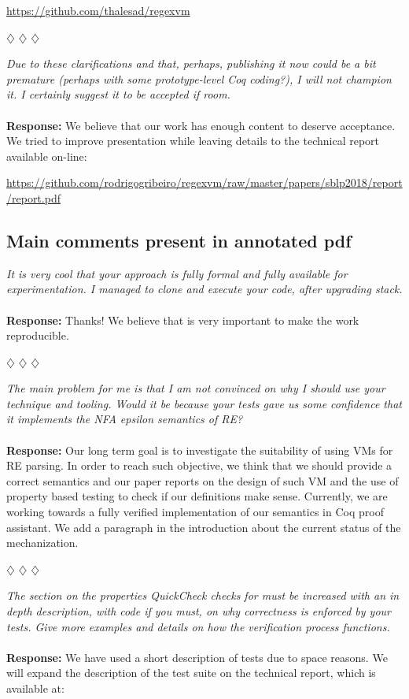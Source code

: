 \documentclass{article}
\newcommand{\separador}{\begin{center}
$\diamondsuit$ $\diamondsuit$ $\diamondsuit$
\end{center}}
\newcommand{\repo}{\begin{center}\url{https://github.com/thalesad/regexvm}\end{center}}
\newcommand{\report}{\begin{center}\url{https://github.com/rodrigogribeiro/regexvm/raw/master/papers/sblp2018/report/report.pdf}\end{center}}
\begin{document}
\repo


\separador

\noindent\textit{Due to these clarifications and that, perhaps, publishing it now could be a bit premature (perhaps with some
prototype-level Coq coding?), I will not champion it. I certainly suggest it to be accepted if room.}
\\
\\
\noindent\textbf{Response:} We believe that our work has enough content to deserve acceptance. We tried to improve presentation while
leaving details to the technical report available on-line:


\report


\subsection*{Main comments present in annotated pdf}

\noindent\textit{It is very cool that your approach is fully formal and fully available for experimentation. I managed to clone and execute your code, after upgrading stack.}
\\
\\
\noindent\textbf{Response:} Thanks! We believe that is very important to make the work reproducible.

\separador

\noindent\textit{The main problem for me is that I am not convinced on why I should use your technique and tooling.  Would it be because your tests gave us some confidence that it implements the NFA epsilon semantics of RE?}
\\
\\
\noindent\textbf{Response:} Our long term goal is to investigate the suitability of using VMs for RE parsing. In order to reach such objective, we think that
we should provide a correct semantics and our paper reports on the design of such VM and the use of property based testing to check if our
definitions make sense. Currently, we are working towards a fully verified implementation of our semantics in Coq proof assistant. We add
a paragraph in the introduction about the current status of the mechanization.

\separador

\noindent\textit{The section on the properties QuickCheck checks for must be increased with an in depth description, with code if you must, on why correctness is enforced by your tests. Give more examples and details on how the verification process functions.}
\\
\\
\noindent\textbf{Response:} We have used a short description of tests due to space reasons. We will expand the description of the test suite on the technical report, which
is available at:
\end{document}

